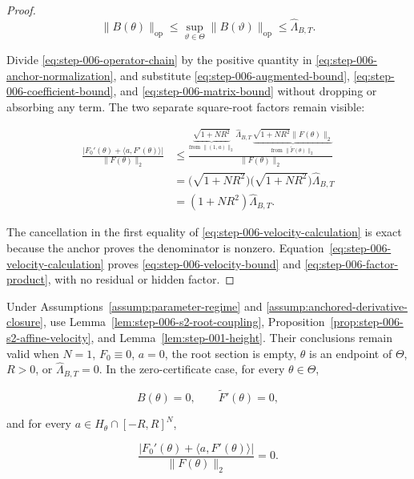 \begin{proof}
\begin{equation}
\lVert B(\theta)\rVert_{\mathrm{op}}
\leq\sup_{\vartheta\in\Theta}\lVert B(\vartheta)\rVert_{\mathrm{op}}
\leq\widehat\Lambda_{B,T}.
\label{eq:step-006-matrix-bound}
\end{equation}

Divide \eqref{eq:step-006-operator-chain} by the positive quantity in
\eqref{eq:step-006-anchor-normalization}, and substitute
\eqref{eq:step-006-augmented-bound},
\eqref{eq:step-006-coefficient-bound}, and
\eqref{eq:step-006-matrix-bound} without dropping or absorbing
any term. The two separate square-root factors remain visible:

\begin{equation}
\begin{aligned}
\frac{\lvert F_0'(\theta)+\langle a,F'(\theta)\rangle\rvert}
     {\lVert F(\theta)\rVert_2}
&\leq
\frac{
\underbrace{\sqrt{1+NR^2}}_{\text{from }\lVert(1,a)\rVert_2}
\,\widehat\Lambda_{B,T}\,
\underbrace{\sqrt{1+NR^2}\lVert F(\theta)\rVert_2}_{\text{from }\lVert\widetilde F(\theta)\rVert_2}}
{\lVert F(\theta)\rVert_2}\\
&=\bigl(\sqrt{1+NR^2}\bigr)
   \bigl(\sqrt{1+NR^2}\bigr)\widehat\Lambda_{B,T}\\
&=(1+NR^2)\widehat\Lambda_{B,T}.
\end{aligned}
\label{eq:step-006-velocity-calculation}
\end{equation}

The cancellation in the first equality of
\eqref{eq:step-006-velocity-calculation} is exact because the anchor proves
the denominator is nonzero. Equation~\eqref{eq:step-006-velocity-calculation}
proves \eqref{eq:step-006-velocity-bound} and
\eqref{eq:step-006-factor-product}, with no residual or hidden factor. 
\end{proof}

\begin{proposition}
\label{prop:step-006-s2-boundary}

Under Assumptions~\ref{assump:parameter-regime} and
\ref{assump:anchored-derivative-closure}, use
Lemma~\ref{lem:step-006-s2-root-coupling},
Proposition~\ref{prop:step-006-s2-affine-velocity}, and
Lemma~\ref{lem:step-001-height}. Their conclusions remain valid when
\(N=1\), \(F_0\equiv0\), \(a=0\), the root section is empty,
\(\theta\) is an endpoint of \(\Theta\), \(R>0\), or
\(\widehat\Lambda_{B,T}=0\). In the zero-certificate case, for every
\(\theta\in\Theta\),

\begin{equation}
\label{eq:appendix-display-192}
B(\theta)=0,
\qquad
\widetilde F'(\theta)=0,
\end{equation}

and for every \(a\in H_\theta\cap[-R,R]^N\),

\begin{equation}
\frac{\lvert F_0'(\theta)+\langle a,F'(\theta)\rangle\rvert}
{\lVert F(\theta)\rVert_2}=0.
\label{eq:step-006-zero-velocity}
\end{equation}


\end{proposition}

